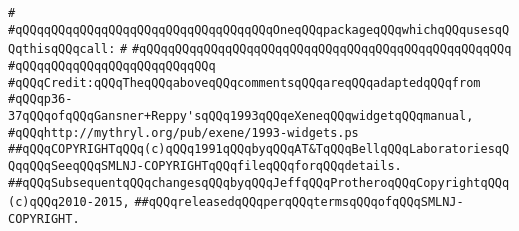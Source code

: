 \verb|#|\newline
\verb|#qQQqqQQqqQQqqQQqqQQqqQQqqQQqqQQqqQQqOneqQQqpackageqQQqwhichqQQqusesqQQqthisqQQqcall:|\newline
\verb|#|\newline
\verb|#qQQqqQQqqQQqqQQqqQQqqQQqqQQqqQQqqQQqqQQqqQQqqQQqqQQq|\newline
\verb|#qQQqqQQqqQQqqQQqqQQqqQQqqQQq|\newline
\verb|#qQQqCredit:qQQqTheqQQqaboveqQQqcommentsqQQqareqQQqadaptedqQQqfrom|\newline
\verb|#qQQqp36-37qQQqofqQQqGansner+Reppy'sqQQq1993qQQqeXeneqQQqwidgetqQQqmanual,|\newline
\verb|#qQQqhttp://mythryl.org/pub/exene/1993-widgets.ps|\newline
\newline
\verb|##qQQqCOPYRIGHTqQQq(c)qQQq1991qQQqbyqQQqAT&TqQQqBellqQQqLaboratoriesqQQqqQQqSeeqQQqSMLNJ-COPYRIGHTqQQqfileqQQqforqQQqdetails.|\newline
\verb|##qQQqSubsequentqQQqchangesqQQqbyqQQqJeffqQQqProtheroqQQqCopyrightqQQq(c)qQQq2010-2015,|\newline
\verb|##qQQqreleasedqQQqperqQQqtermsqQQqofqQQqSMLNJ-COPYRIGHT.|\newline

